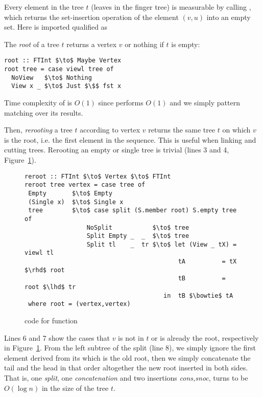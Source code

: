 Every element in the tree $t$ (leaves in the finger tree) is measurable by calling , which returns the set-insertion operation of the element $(v,u)$ into an empty set. Here  is imported qualified as 

The \textit{root} of a tree $t$ returns a vertex $v$ or nothing if $t$ is empty:
\begin{lstlisting}[mathescape]
root :: FTInt $\to$ Maybe Vertex  
root tree = case viewl tree of
  NoView   $\to$ Nothing
  View x _ $\to$ Just $\$$ fst x
\end{lstlisting}

Time complexity of  is $O(1)$ since  performs $O(1)$ and we simply pattern matching over its results.

Then, \textit{rerooting} a tree $t$ according to vertex $v$ returns the same tree $t$ on which $v$ is the root, i.e. the first element in the sequence. This is useful when linking and cutting trees. Rerooting an empty or single tree is trivial (lines 3 and 4, Figure~\ref{fig:reroot}). 
\begin{figure}
\begin{lstlisting}[mathescape]
reroot :: FTInt $\to$ Vertex $\to$ FTInt
reroot tree vertex = case tree of 
 Empty       $\to$ Empty 
 (Single x)  $\to$ Single x
 tree        $\to$ case split (S.member root) S.empty tree of 
                 NoSplit           $\to$ tree
                 Split Empty _  _  $\to$ tree 
                 Split tl    _  tr $\to$ let (View _ tX) = viewl tl 
                                          tA          = tX $\rhd$ root 
                                          tB          = root $\lhd$ tr 
                                      in  tB $\bowtie$ tA 
 where root = (vertex,vertex) 
\end{lstlisting} 
\caption{code for  function}
\label{fig:reroot}
\end{figure}
Lines 6 and 7 show the cases that $v$ is not in $t$ or is already the root, respectively in Figure~\ref{fig:reroot}. From the left subtree of the split (line 8), we simply ignore the first element derived from its  which is the old root, then we simply concatenate the tail and the head in that order altogether the new root inserted in both sides. That is, one \textit{split}, one \textit{concatenation} and two insertions \textit{cons,snoc}, turns to be $O(\log n)$ in the size of the tree $t$.  


